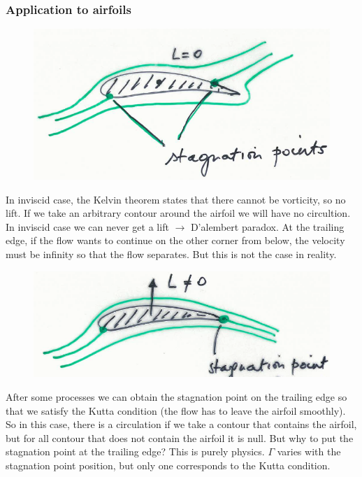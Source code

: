 	\subsubsection{Application to airfoils}
		\begin{figure}
		\vspace{-5mm}
		\includegraphics[scale=0.35]{ch1/3}
		\end{figure}
		In inviscid case, the Kelvin theorem states that there cannot be vorticity, so no lift. If we take an arbitrary contour around the airfoil we will have no circultion. In inviscid case we can never get a lift $\rightarrow$ D’alembert paradox. At the trailing edge, if the flow wants to continue on the other corner from below, the velocity must be infinity so that the flow separates. But this is not the case in reality. \\

		\begin{figure}
		\vspace{-5mm}
		\includegraphics[scale=0.35]{ch1/4}
		\end{figure}
		After some processes we can obtain the stagnation point on the trailing edge so that we satisfy the Kutta condition (the flow has to leave the airfoil smoothly). So in this case, there is a circulation if we take a contour that contains the airfoil, but for all contour that does not contain the airfoil it is null. But why to put the stagnation point at the trailing edge? This is purely physics. $\Gamma$ varies with the stagnation point position, but only one corresponds to the Kutta condition. \\
		
